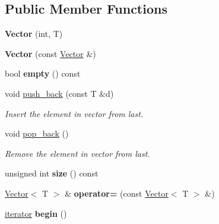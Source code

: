 \subsection*{Public Member Functions}
\begin{DoxyCompactItemize}
\item 
\mbox{\label{classVector_a8656ea9785cd568035328afec77a753c}} 
{\bfseries Vector} (int, T)
\item 
\mbox{\label{classVector_a4edc1cac2c4cd6d3791280edabd89029}} 
{\bfseries Vector} (const \hyperlink{classVector}{Vector} \&)
\item 
\mbox{\label{classVector_ad688a8a0dfbd07ea63d838058a436f79}} 
bool {\bfseries empty} () const
\item 
void \hyperlink{classVector_aed29bfc8028b4c6c18ebe89ed3f02119}{push\+\_\+back} (const T \&d)
\begin{DoxyCompactList}\small\item\em Insert the element in vector from last. \end{DoxyCompactList}\item 
\mbox{\label{classVector_adcba035109febbe55cba2a25f8483ba6}} 
void \hyperlink{classVector_adcba035109febbe55cba2a25f8483ba6}{pop\+\_\+back} ()
\begin{DoxyCompactList}\small\item\em Remove the element in vector from last. \end{DoxyCompactList}\item 
\mbox{\label{classVector_a5214a382564aedc712b609416aa3b7b1}} 
unsigned int {\bfseries size} () const
\item 
\mbox{\label{classVector_a84e014345158da7a6b89a4879c8086c4}} 
\hyperlink{classVector}{Vector}$<$ T $>$ \& {\bfseries operator=} (const \hyperlink{classVector}{Vector}$<$ T $>$ \&)
\item 
\mbox{\label{classVector_ad1dc835efbf1859b3bd960c9b4f55ad4}} 
\hyperlink{classVector_1_1iterator}{iterator} {\bfseries begin} ()
\item 
\mbox{\label{classVector_ac03563dbb2d417a36096b524a4875674}} 

\end{DoxyCompactItemize}

